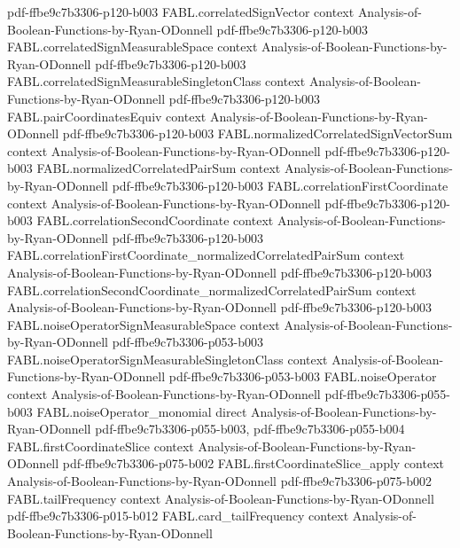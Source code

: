 \begin{theorem}
  {pdf-ffbe9c7b3306-p120-b003}
\proofstep
  {FABL.correlatedSignVector}
  {context}
  {Analysis-of-Boolean-Functions-by-Ryan-ODonnell}
  {pdf-ffbe9c7b3306-p120-b003}
\proofstep
  {FABL.correlatedSignMeasurableSpace}
  {context}
  {Analysis-of-Boolean-Functions-by-Ryan-ODonnell}
  {pdf-ffbe9c7b3306-p120-b003}
\proofstep
  {FABL.correlatedSignMeasurableSingletonClass}
  {context}
  {Analysis-of-Boolean-Functions-by-Ryan-ODonnell}
  {pdf-ffbe9c7b3306-p120-b003}
\proofstep
  {FABL.pairCoordinatesEquiv}
  {context}
  {Analysis-of-Boolean-Functions-by-Ryan-ODonnell}
  {pdf-ffbe9c7b3306-p120-b003}
\proofstep
  {FABL.normalizedCorrelatedSignVectorSum}
  {context}
  {Analysis-of-Boolean-Functions-by-Ryan-ODonnell}
  {pdf-ffbe9c7b3306-p120-b003}
\proofstep
  {FABL.normalizedCorrelatedPairSum}
  {context}
  {Analysis-of-Boolean-Functions-by-Ryan-ODonnell}
  {pdf-ffbe9c7b3306-p120-b003}
\proofstep
  {FABL.correlationFirstCoordinate}
  {context}
  {Analysis-of-Boolean-Functions-by-Ryan-ODonnell}
  {pdf-ffbe9c7b3306-p120-b003}
\proofstep
  {FABL.correlationSecondCoordinate}
  {context}
  {Analysis-of-Boolean-Functions-by-Ryan-ODonnell}
  {pdf-ffbe9c7b3306-p120-b003}
\proofstep
  {FABL.correlationFirstCoordinate_normalizedCorrelatedPairSum}
  {context}
  {Analysis-of-Boolean-Functions-by-Ryan-ODonnell}
  {pdf-ffbe9c7b3306-p120-b003}
\proofstep
  {FABL.correlationSecondCoordinate_normalizedCorrelatedPairSum}
  {context}
  {Analysis-of-Boolean-Functions-by-Ryan-ODonnell}
  {pdf-ffbe9c7b3306-p120-b003}
\proofstep
  {FABL.noiseOperatorSignMeasurableSpace}
  {context}
  {Analysis-of-Boolean-Functions-by-Ryan-ODonnell}
  {pdf-ffbe9c7b3306-p053-b003}
\proofstep
  {FABL.noiseOperatorSignMeasurableSingletonClass}
  {context}
  {Analysis-of-Boolean-Functions-by-Ryan-ODonnell}
  {pdf-ffbe9c7b3306-p053-b003}
\proofstep
  {FABL.noiseOperator}
  {context}
  {Analysis-of-Boolean-Functions-by-Ryan-ODonnell}
  {pdf-ffbe9c7b3306-p055-b003}
\proofstep
  {FABL.noiseOperator_monomial}
  {direct}
  {Analysis-of-Boolean-Functions-by-Ryan-ODonnell}
  {pdf-ffbe9c7b3306-p055-b003,
    pdf-ffbe9c7b3306-p055-b004}
\proofstep
  {FABL.firstCoordinateSlice}
  {context}
  {Analysis-of-Boolean-Functions-by-Ryan-ODonnell}
  {pdf-ffbe9c7b3306-p075-b002}
\proofstep
  {FABL.firstCoordinateSlice_apply}
  {context}
  {Analysis-of-Boolean-Functions-by-Ryan-ODonnell}
  {pdf-ffbe9c7b3306-p075-b002}
\proofstep
  {FABL.tailFrequency}
  {context}
  {Analysis-of-Boolean-Functions-by-Ryan-ODonnell}
  {pdf-ffbe9c7b3306-p015-b012}
\proofstep
  {FABL.card_tailFrequency}
  {context}
  {Analysis-of-Boolean-Functions-by-Ryan-ODonnell}

\end{theorem}
